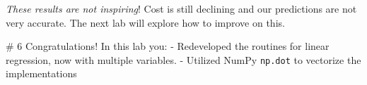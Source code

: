 \documentclass[11pt]{article}
\makeatletter
\newcommand{\boxspacing}{\kern\kvtcb@left@rule\kern\kvtcb@boxsep}
\newcommand{\prompt}[4]{
        \ttfamily\llap{{\color{#2}[#3]:\hspace{3pt}#4}}\vspace{-\baselineskip}
    }
\makeatother
\begin{document}
    \emph{These results are not inspiring}! Cost is still declining and our
predictions are not very accurate. The next lab will explore how to
improve on this.

    \# 6 Congratulations! In this lab you: - Redeveloped the routines for
linear regression, now with multiple variables. - Utilized NumPy
\texttt{np.dot} to vectorize the implementations

    \begin{tcolorbox}[breakable, size=fbox, boxrule=1pt, pad at break*=1mm,colback=cellbackground, colframe=cellborder]
\prompt{In}{incolor}{ }{\boxspacing}
\begin{Verbatim}[commandchars=\\\{\}]

\end{Verbatim}
\end{tcolorbox}


    
    
    
\end{document}
